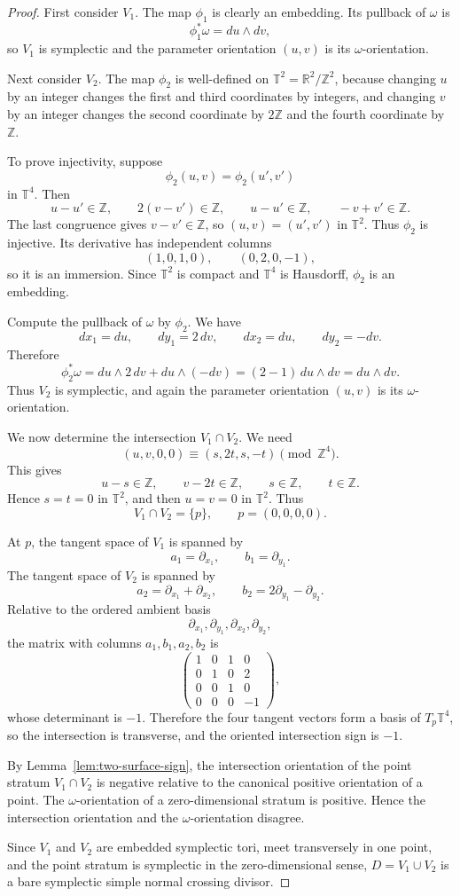 \documentclass[12pt]{article}
\newcommand{\R}{\mathbb R}
\newcommand{\Z}{\mathbb Z}
\newcommand{\T}{\mathbb T}
\begin{document}
\begin{proof}
First consider \(V_1\). The map \(\phi_1\) is clearly an embedding. Its pullback of \(\omega\) is
\[
\phi_1^*\omega=du\wedge dv,
\]
so \(V_1\) is symplectic and the parameter orientation \((u,v)\) is its \(\omega\)-orientation.

Next consider \(V_2\). The map \(\phi_2\) is well-defined on \(\T^2=\R^2/\Z^2\), because changing \(u\) by an integer changes the first and third coordinates by integers, and changing \(v\) by an integer changes the second coordinate by \(2\Z\) and the fourth coordinate by \(\Z\).

To prove injectivity, suppose
\[
\phi_2(u,v)=\phi_2(u',v')
\]
in \(\T^4\). Then
\[
u-u'\in\Z,\qquad 2(v-v')\in\Z,\qquad u-u'\in\Z,\qquad -v+v'\in\Z.
\]
The last congruence gives \(v-v'\in\Z\), so \((u,v)=(u',v')\) in \(\T^2\). Thus \(\phi_2\) is injective. Its derivative has independent columns
\[
(1,0,1,0),\qquad (0,2,0,-1),
\]
so it is an immersion. Since \(\T^2\) is compact and \(\T^4\) is Hausdorff, \(\phi_2\) is an embedding.

Compute the pullback of \(\omega\) by \(\phi_2\). We have
\[
dx_1=du,\qquad dy_1=2\,dv,\qquad dx_2=du,\qquad dy_2=-dv.
\]
Therefore
\[
\phi_2^*\omega
=
du\wedge 2\,dv+du\wedge(-dv)
=
(2-1)\,du\wedge dv
=
du\wedge dv.
\]
Thus \(V_2\) is symplectic, and again the parameter orientation \((u,v)\) is its \(\omega\)-orientation.

We now determine the intersection \(V_1\cap V_2\). We need
\[
(u,v,0,0)\equiv(s,2t,s,-t)\pmod{\Z^4}.
\]
This gives
\[
u-s\in\Z,\qquad v-2t\in\Z,\qquad s\in\Z,\qquad t\in\Z.
\]
Hence \(s=t=0\) in \(\T^2\), and then \(u=v=0\) in \(\T^2\). Thus
\[
V_1\cap V_2=\{p\},
\qquad
p=(0,0,0,0).
\]

At \(p\), the tangent space of \(V_1\) is spanned by
\[
a_1=\partial_{x_1},\qquad b_1=\partial_{y_1}.
\]
The tangent space of \(V_2\) is spanned by
\[
a_2=\partial_{x_1}+\partial_{x_2},
\qquad
b_2=2\partial_{y_1}-\partial_{y_2}.
\]
Relative to the ordered ambient basis
\[
\partial_{x_1},\partial_{y_1},\partial_{x_2},\partial_{y_2},
\]
the matrix with columns \(a_1,b_1,a_2,b_2\) is
\[
\begin{pmatrix}
1&0&1&0\\
0&1&0&2\\
0&0&1&0\\
0&0&0&-1
\end{pmatrix},
\]
whose determinant is \(-1\). Therefore the four tangent vectors form a basis of \(T_p\T^4\), so the intersection is transverse, and the oriented intersection sign is \(-1\).

By Lemma~\ref{lem:two-surface-sign}, the intersection orientation of the point stratum \(V_1\cap V_2\) is negative relative to the canonical positive orientation of a point. The \(\omega\)-orientation of a zero-dimensional stratum is positive. Hence the intersection orientation and the \(\omega\)-orientation disagree.

Since \(V_1\) and \(V_2\) are embedded symplectic tori, meet transversely in one point, and the point stratum is symplectic in the zero-dimensional sense, \(D=V_1\cup V_2\) is a bare symplectic simple normal crossing divisor.
\end{proof}
\end{document}
